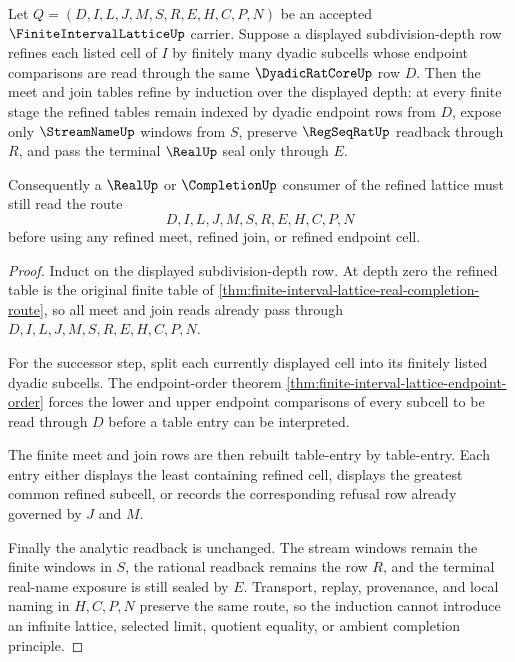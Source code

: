 \begin{theorem}
\label{thm:finite-interval-lattice-refinement-induction}
Let $Q=(D,I,L,J,M,S,R,E,H,C,P,N)$ be an accepted $\FiniteIntervalLatticeUp$ carrier. Suppose a displayed subdivision-depth row refines each listed cell of $I$ by finitely many dyadic subcells whose endpoint comparisons are read through the same $\DyadicRatCoreUp$ row $D$. Then the meet and join tables refine by induction over the displayed depth: at every finite stage the refined tables remain indexed by dyadic endpoint rows from $D$, expose only $\StreamNameUp$ windows from $S$, preserve $\RegSeqRatUp$ readback through $R$, and pass the terminal $\RealUp$ seal only through $E$.

Consequently a $\RealUp$ or $\CompletionUp$ consumer of the refined lattice must still read the route
$$
D,I,L,J,M,S,R,E,H,C,P,N
$$
before using any refined meet, refined join, or refined endpoint cell.
\end{theorem}
\begin{proof}
Induct on the displayed subdivision-depth row. At depth zero the refined table is the original finite table of \autoref{thm:finite-interval-lattice-real-completion-route}, so all meet and join reads already pass through $D,I,L,J,M,S,R,E,H,C,P,N$.

For the successor step, split each currently displayed cell into its finitely listed dyadic subcells. The endpoint-order theorem \autoref{thm:finite-interval-lattice-endpoint-order} forces the lower and upper endpoint comparisons of every subcell to be read through $D$ before a table entry can be interpreted.

The finite meet and join rows are then rebuilt table-entry by table-entry. Each entry either displays the least containing refined cell, displays the greatest common refined subcell, or records the corresponding refusal row already governed by $J$ and $M$.

Finally the analytic readback is unchanged. The stream windows remain the finite windows in $S$, the rational readback remains the row $R$, and the terminal real-name exposure is still sealed by $E$. Transport, replay, provenance, and local naming in $H,C,P,N$ preserve the same route, so the induction cannot introduce an infinite lattice, selected limit, quotient equality, or ambient completion principle.
\end{proof}

